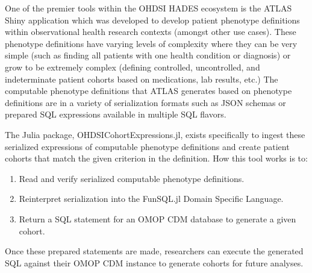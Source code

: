 \documentclass{juliacon}
\begin{document}

One of the premier tools within the OHDSI HADES ecosystem is the ATLAS Shiny application which was developed to develop patient phenotype definitions within observational health research contexts (amongst other use cases).
These phenotype definitions have varying levels of complexity where they can be very simple (such as finding all patients with one health condition or diagnosis) or grow to be extremely complex (defining controlled, uncontrolled, and indeterminate patient cohorts based on medications, lab results, etc.)
The computable phenotype definitions that ATLAS generates based on phenotype definitions are in a variety of serialization formats such as JSON schemas or prepared SQL expressions available in multiple SQL flavors.\footnotemark


The Julia package, OHDSICohortExpressions.jl, exists specifically to ingest these serialized expressions of computable phenotype definitions and create patient cohorts that match the given criterion in the definition. \cite{evansOHDSICohortExpressionsJl2023}
How this tool works is to:

\begin{enumerate}

\item Read and verify serialized computable phenotype definitions.

\item Reinterpret serialization into the FunSQL.jl Domain Specific Language.

\item Return a SQL statement for an OMOP CDM database to generate a given cohort.

\end{enumerate}

Once these prepared statements are made, researchers can execute the generated SQL against their OMOP CDM instance to generate cohorts for future analyses.
\end{document}
